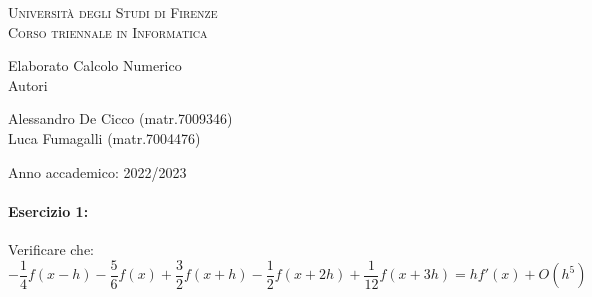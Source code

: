 \documentclass[12pt]{article}
\begin{document}
\begin{titlepage}
\centering

\vspace*{20mm}
\textsc{\LARGE Università degli Studi di Firenze}\\[0.5cm]
\textsc{\Large Corso triennale in Informatica}\\[0.5cm]

\vspace{20mm}

\huge Elaborato Calcolo Numerico\\[0.5cm]

\vspace{20mm}
\small Autori

\Large Alessandro De Cicco (matr.7009346) \\ Luca Fumagalli (matr.7004476)\\[0.5cm]

\vspace{10mm}

\large Anno accademico: 2022/2023\\[0.5cm]

\end{titlepage}

\paragraph{Esercizio 1:}
Verificare che:
$$ -\frac{1}{4}f(x-h)-\frac{5}{6}f(x)+\frac{3}{2}f(x+h)-\frac{1}{2}f(x+2h)+\frac{1}{12}f(x+3h)=hf'(x) + O(h^5)$$
\end{document}
